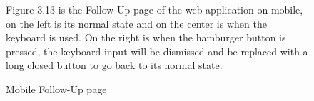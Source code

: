 \documentclass[12pt,oneside,openright,a4paper]{cpe-english-project}
\begin{document}
\begin{figure}[!h]
\begin{minipage}{.3\textwidth}
      \end{minipage}
      \caption{Mobile Follow-Up page}\label{fig:Mob_Follow}
      \begin{flushleft}
        \qquad Figure 3.13 is the Follow-Up page of the web application on mobile, on the left is its normal state and on the center is when the keyboard is used. On the right is when the hamburger button is pressed, the keyboard input will be dismissed and be replaced with a long closed button to go back to its normal state. \par
      \end{flushleft}
    \end{figure}
\end{document}
